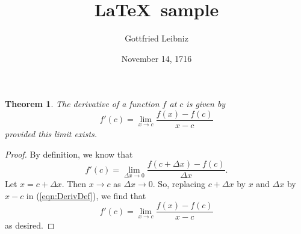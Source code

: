 \documentclass[11pt]{amsart}
\title{\LaTeX~sample}
\author{Gottfried Leibniz}
\date{November 14, 1716}
\newtheorem{theorem}{Theorem}
\theoremstyle{remark}
\begin{document}
\maketitle

\begin{theorem}
The derivative of a function $f$ at $c$ is given by
\[
  f'(c) = \lim_{x\to c} \frac{f(x)-f(c)}{x-c}
\]
provided this limit exists.
\end{theorem}
\begin{proof}
By definition, we know that
\begin{equation}\label{eqn:DerivDef}
  f'(c) = \lim_{\Delta x\to 0} \frac{f(c+\Delta x)-f(c)}{\Delta x}.
\end{equation}
Let $x = c+\Delta x$.  Then $x\to c$ as $\Delta x\to 0$.  So, replacing
$c+\Delta x$ by $x$ and $\Delta x$ by  $x-c$ in (\ref{eqn:DerivDef}),
we find that
\[
  f'(c) = \lim_{x\to c}\frac{f(x)-f(c)}{x-c}
\]
as desired.
\end{proof}
\end{document}
